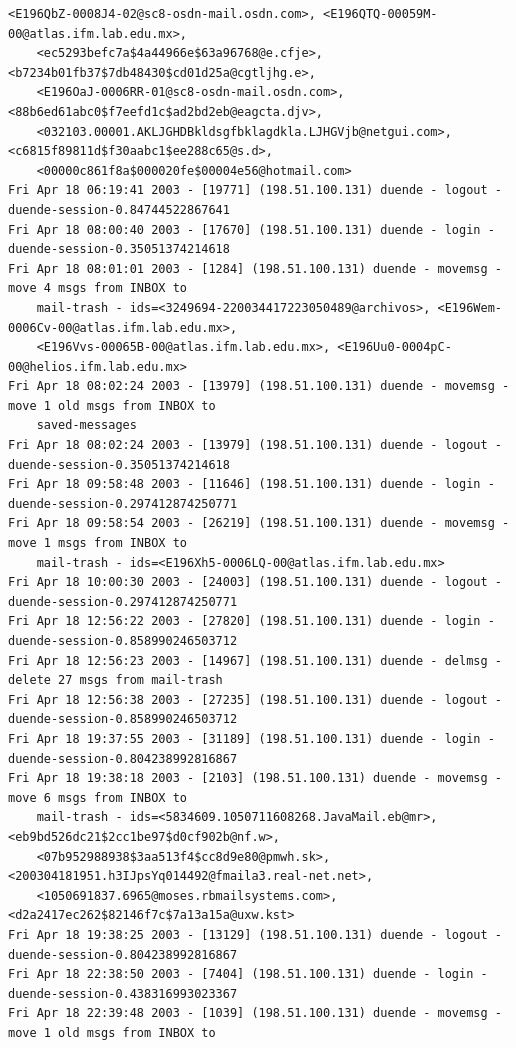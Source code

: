 \begin{lstlisting}[style=terminal]
    <E196QbZ-0008J4-02@sc8-osdn-mail.osdn.com>, <E196QTQ-00059M-00@atlas.ifm.lab.edu.mx>, 
    <ec5293befc7a$4a44966e$63a96768@e.cfje>, <b7234b01fb37$7db48430$cd01d25a@cgtljhg.e>, 
    <E196OaJ-0006RR-01@sc8-osdn-mail.osdn.com>, <88b6ed61abc0$f7eefd1c$ad2bd2eb@eagcta.djv>, 
    <032103.00001.AKLJGHDBkldsgfbklagdkla.LJHGVjb@netgui.com>, <c6815f89811d$f30aabc1$ee288c65@s.d>, 
    <00000c861f8a$000020fe$00004e56@hotmail.com>
Fri Apr 18 06:19:41 2003 - [19771] (198.51.100.131) duende - logout - duende-session-0.84744522867641
Fri Apr 18 08:00:40 2003 - [17670] (198.51.100.131) duende - login - duende-session-0.35051374214618
Fri Apr 18 08:01:01 2003 - [1284] (198.51.100.131) duende - movemsg - move 4 msgs from INBOX to 
    mail-trash - ids=<3249694-220034417223050489@archivos>, <E196Wem-0006Cv-00@atlas.ifm.lab.edu.mx>, 
    <E196Vvs-00065B-00@atlas.ifm.lab.edu.mx>, <E196Uu0-0004pC-00@helios.ifm.lab.edu.mx>
Fri Apr 18 08:02:24 2003 - [13979] (198.51.100.131) duende - movemsg - move 1 old msgs from INBOX to 
    saved-messages
Fri Apr 18 08:02:24 2003 - [13979] (198.51.100.131) duende - logout - duende-session-0.35051374214618
Fri Apr 18 09:58:48 2003 - [11646] (198.51.100.131) duende - login - duende-session-0.297412874250771
Fri Apr 18 09:58:54 2003 - [26219] (198.51.100.131) duende - movemsg - move 1 msgs from INBOX to 
    mail-trash - ids=<E196Xh5-0006LQ-00@atlas.ifm.lab.edu.mx>
Fri Apr 18 10:00:30 2003 - [24003] (198.51.100.131) duende - logout - duende-session-0.297412874250771
Fri Apr 18 12:56:22 2003 - [27820] (198.51.100.131) duende - login - duende-session-0.858990246503712
Fri Apr 18 12:56:23 2003 - [14967] (198.51.100.131) duende - delmsg - delete 27 msgs from mail-trash
Fri Apr 18 12:56:38 2003 - [27235] (198.51.100.131) duende - logout - duende-session-0.858990246503712
Fri Apr 18 19:37:55 2003 - [31189] (198.51.100.131) duende - login - duende-session-0.804238992816867
Fri Apr 18 19:38:18 2003 - [2103] (198.51.100.131) duende - movemsg - move 6 msgs from INBOX to 
    mail-trash - ids=<5834609.1050711608268.JavaMail.eb@mr>, <eb9bd526dc21$2cc1be97$d0cf902b@nf.w>, 
    <07b952988938$3aa513f4$cc8d9e80@pmwh.sk>, <200304181951.h3IJpsYq014492@fmaila3.real-net.net>, 
    <1050691837.6965@moses.rbmailsystems.com>, <d2a2417ec262$82146f7c$7a13a15a@uxw.kst>
Fri Apr 18 19:38:25 2003 - [13129] (198.51.100.131) duende - logout - duende-session-0.804238992816867
Fri Apr 18 22:38:50 2003 - [7404] (198.51.100.131) duende - login - duende-session-0.438316993023367
Fri Apr 18 22:39:48 2003 - [1039] (198.51.100.131) duende - movemsg - move 1 old msgs from INBOX to 

\end{lstlisting}
